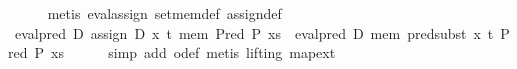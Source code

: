 \begin{isabellebody}
\ \ \ \ \isamarkupfalse%
\ {}metis\ eval{}assign{}\ set{}mem{}def\ assign{}def{}\isanewline
\ \ \isamarkupfalse%
\ {}eval{}pred\ D\ {}assign\ D\ x\ t\ mem{}\ {}Pred\ P\ xs{}\ {}\ eval{}pred\ D\ mem\ {}pred{}subst\ x\ t\ {}Pred\ P\ xs{}{}{}\isanewline
\ \ \ \ \isamarkupfalse%
\ {}simp\ add{}\ o{}def{}\ metis\ {}lifting{}\ map{}ext{}\isanewline
{}\isamarkupfalse%
%
\endisatagproof
{\isafoldproof}%
%
\isadelimproof
\isanewline
%
\endisadelimproof
%
\isadelimtheory
\isanewline
%
\endisadelimtheory
%
\isatagtheory
{}\isamarkupfalse%
%
\endisatagtheory
{\isafoldtheory}%
%
\isadelimtheory
\isanewline
%
\endisadelimtheory
\end{isabellebody}%

